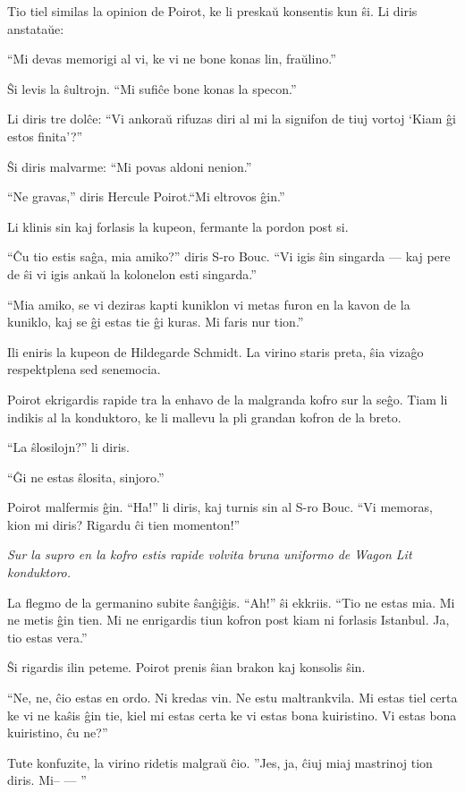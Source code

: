 Tio tiel similas la opinion de Poirot, ke li preskaŭ konsentis kun ŝi. Li diris anstataŭe:

``Mi devas memorigi al vi, ke vi ne bone konas lin, fraŭlino.''

Ŝi levis la ŝultrojn. ``Mi sufiĉe bone konas la specon.''

Li diris tre dolĉe: ``Vi ankoraŭ rifuzas diri al mi la signifon de tiuj vortoj `Kiam ĝi estos finita'?''

Ŝi diris malvarme: ``Mi povas aldoni nenion.''

``Ne gravas,'' diris Hercule Poirot.``Mi eltrovos ĝin.''

Li klinis sin kaj forlasis la kupeon, fermante la pordon post si.

``Ĉu tio estis saĝa, mia amiko?'' diris S-ro Bouc. ``Vi igis ŝin singarda --- kaj pere de ŝi vi igis ankaŭ la kolonelon esti singarda.''

``Mia amiko, se vi deziras kapti kuniklon vi metas furon en la kavon de la kuniklo, kaj se ĝi estas tie ĝi kuras. Mi faris nur tion.''

Ili eniris la kupeon de Hildegarde Schmidt. La virino staris preta, ŝia vizaĝo respektplena sed senemocia.

Poirot ekrigardis rapide tra la enhavo de la malgranda kofro sur la seĝo. Tiam li indikis al la konduktoro, ke li mallevu la pli grandan kofron de la breto.

``La ŝlosilojn?'' li diris.

``Ĝi ne estas ŝlosita, sinjoro.''

Poirot malfermis ĝin. ``Ha!'' li diris, kaj turnis sin al S-ro Bouc. ``Vi memoras, kion mi diris? Rigardu ĉi tien momenton!''

\emph{Sur la supro en la kofro estis rapide volvita bruna uniformo de Wagon Lit konduktoro.}

La flegmo de la germanino subite ŝanĝiĝis. ``Ah!'' ŝi ekkriis. ``Tio ne estas mia. Mi ne metis ĝin tien. Mi ne enrigardis tiun kofron post kiam ni forlasis Istanbul. Ja, tio estas vera.''

Ŝi rigardis ilin peteme. Poirot prenis ŝian brakon kaj konsolis ŝin.

``Ne, ne, ĉio estas en ordo. Ni kredas vin. Ne estu maltrankvila. Mi estas tiel certa ke vi ne kaŝis ĝin tie, kiel mi estas certa ke vi estas bona kuiristino. Vi estas bona kuiristino, ĉu ne?''

Tute konfuzite, la virino ridetis malgraŭ ĉio. ''Jes, ja, ĉiuj miaj mastrinoj tion diris. Mi-- --- ''

